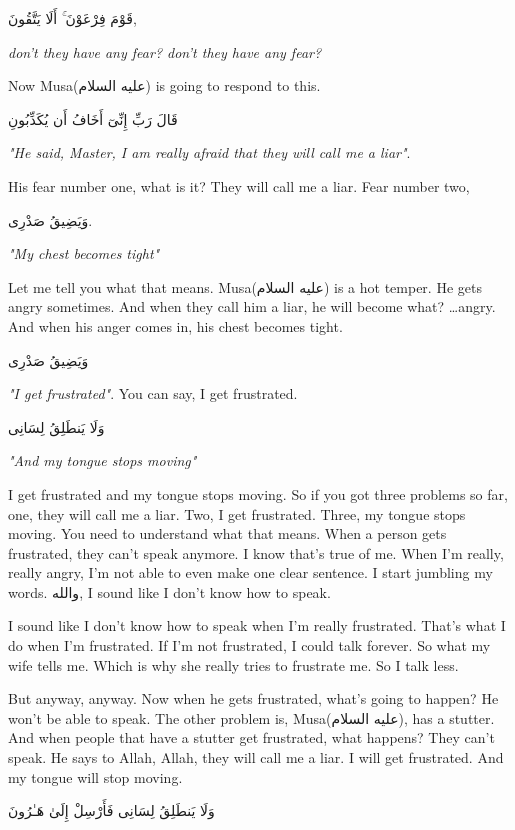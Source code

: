 \documentclass[12pt]{article}
\newcommand{\as}{\textarabic{(عليه السلام)}}
\begin{document}
\textarabic{قَوْمَ فِرْعَوْنَ ۚ أَلَا يَتَّقُونَ}, 

\textit{don't they have any fear? don't they have any fear?}

Now Musa\as{} is going to respond to this. 

\textarabic{ قَالَ رَبِّ إِنِّىٓ أَخَافُ أَن يُكَذِّبُونِ} 

\textit{"He said, Master, I am really afraid that they will call me a liar"}. 

His fear number one, what is it? They will call me a liar. Fear number two,

\textarabic{وَيَضِيقُ صَدْرِى}. 

\textit{"My chest becomes tight"}
   
Let me tell you what that means. Musa\as{} is a hot temper. He gets angry sometimes. And when they call him a liar, he will become what? \dots angry. And when his anger comes in, his chest becomes tight. 

\textarabic{وَيَضِيقُ صَدْرِى} 

\textit{"I get frustrated"}. You can say, I get frustrated. 

\textarabic{وَلَا يَنطَلِقُ لِسَانِى} 

\textit{"And my tongue stops moving"}
   
I get frustrated and my tongue stops moving. So if you got three problems so far, one, they will call me a liar. Two, I get frustrated. Three, my tongue stops moving. You need to understand what that means. When a person gets frustrated, they can't speak anymore. I know that's true of me. When I'm really, really angry, I'm not able to even make one clear sentence. I start jumbling my words. \textarabic{والله}, I sound like I don't know how to speak. 
   
I sound like I don't know how to speak when I'm really frustrated. That's what I do when I'm frustrated. If I'm not frustrated, I could talk forever. So what my wife tells me. Which is why she really tries to frustrate me. So I talk less. 
   
But anyway, anyway. Now when he gets frustrated, what's going to happen? He won't be able to speak. The other problem is, Musa\as{}, has a stutter. And when people that have a stutter get frustrated, what happens? They can't speak. He says to Allah, Allah, they will call me a liar. I will get frustrated. And my tongue will stop moving. 

\textarabic{وَلَا يَنطَلِقُ لِسَانِى فَأَرْسِلْ إِلَىٰ هَـٰرُونَ} 
\end{document}
